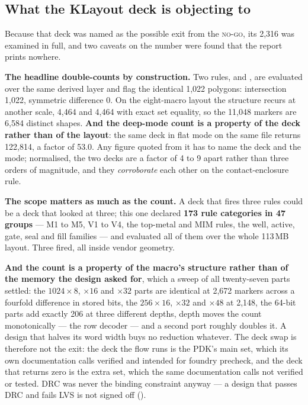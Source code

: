 \subsection{What the KLayout deck is objecting to}

Because that deck was named as the possible exit from the
\textsc{no-go}, its 2,316 was examined in full, and two caveats on the
number were found that the report prints nowhere.

\textbf{The headline double-counts by construction.} Two rules,
 and , are evaluated over the same derived
layer and flag the identical 1,022 polygons: intersection 1,022,
symmetric difference 0. On the eight-macro layout the structure recurs
at another scale, 4,464 and 4,464 with exact set equality, so the 11,048
markers are 6,584 distinct shapes. \textbf{And the deep-mode count is a
property of the deck rather than of the layout}: the same deck in flat
mode on the same file returns 122,814, a factor of 53.0. Any figure
quoted from it has to name the deck and the mode; normalised, the two
decks are a factor of 4 to 9 apart rather than three orders of
magnitude, and they \emph{corroborate} each other on the
contact-enclosure rule.

\textbf{The scope matters as much as the count.} A deck that fires three
rules could be a deck that looked at three; this one declared
\textbf{173 rule categories in 47 groups} --- M1 to M5, V1 to V4, the
top-metal and MIM rules, the well, active, gate, seal and fill families
--- and evaluated all of them over the whole 113\,MB layout. Three
fired, all inside vendor geometry.

\textbf{And the count is a property of the macro's structure rather than
of the memory the design asked for}, which a sweep of all twenty-seven
parts settled: the $1024\times8$, $\times16$ and $\times32$ parts are
identical at 2,672 markers across a fourfold difference in stored bits,
the $256\times16$, $\times32$ and $\times48$ at 2,148, the 64-bit parts
add exactly 206 at three different depths, depth moves the count
monotonically --- the row decoder --- and a second port roughly doubles
it. A design that halves its word width buys no reduction whatever. The
deck swap is therefore not the exit: the deck the flow runs is the PDK's
main set, which its own documentation calls verified and intended for
foundry precheck, and the deck that returns zero is the extra set, which
the same documentation calls not verified or tested. DRC was never the
binding constraint anyway --- a design that passes DRC and fails LVS is
not signed off ().

